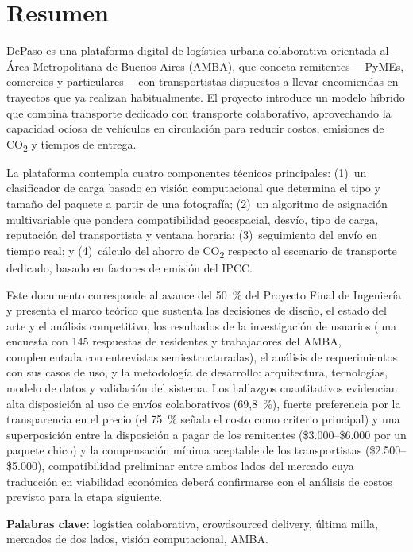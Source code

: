 \chapter*{Resumen}

DePaso es una plataforma digital de logística urbana colaborativa orientada al Área Metropolitana de Buenos Aires (AMBA), que conecta remitentes ---PyMEs, comercios y particulares--- con transportistas dispuestos a llevar encomiendas en trayectos que ya realizan habitualmente. El proyecto introduce un modelo híbrido que combina transporte dedicado con transporte colaborativo, aprovechando la capacidad ociosa de vehículos en circulación para reducir costos, emisiones de CO\textsubscript{2} y tiempos de entrega.

La plataforma contempla cuatro componentes técnicos principales: (1)~un clasificador de carga basado en visión computacional que determina el tipo y tamaño del paquete a partir de una fotografía; (2)~un algoritmo de asignación multivariable que pondera compatibilidad geoespacial, desvío, tipo de carga, reputación del transportista y ventana horaria; (3)~seguimiento del envío en tiempo real; y (4)~cálculo del ahorro de CO\textsubscript{2} respecto al escenario de transporte dedicado, basado en factores de emisión del IPCC.

{\color{nuevo}Este documento corresponde al avance del 50~\% del Proyecto Final de Ingeniería y presenta el marco teórico que sustenta las decisiones de diseño, el estado del arte y el análisis competitivo, los resultados de la investigación de usuarios (una encuesta con 145 respuestas de residentes y trabajadores del AMBA, complementada con entrevistas semiestructuradas), el análisis de requerimientos con sus casos de uso, y la metodología de desarrollo: arquitectura, tecnologías, modelo de datos y validación del sistema. Los hallazgos cuantitativos evidencian alta disposición al uso de envíos colaborativos (69,8~\%), fuerte preferencia por la transparencia en el precio (el 75~\% señala el costo como criterio principal) y una superposición entre la disposición a pagar de los remitentes (\$3.000--\$6.000 por un paquete chico) y la compensación mínima aceptable de los transportistas (\$2.500--\$5.000), compatibilidad preliminar entre ambos lados del mercado cuya traducción en viabilidad económica deberá confirmarse con el análisis de costos previsto para la etapa siguiente.}

\textbf{Palabras clave:} logística colaborativa, crowdsourced delivery, última milla, mercados de dos lados, visión computacional, AMBA.
